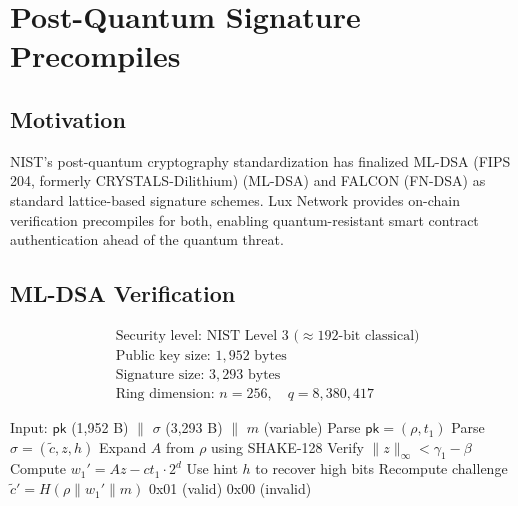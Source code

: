 \section{Post-Quantum Signature Precompiles}
\label{sec:pq}

\subsection{Motivation}

NIST's post-quantum cryptography standardization \cite{nistpqc2024} has finalized ML-DSA (FIPS 204, formerly CRYSTALS-Dilithium) (ML-DSA) and FALCON (FN-DSA) as standard lattice-based signature schemes. Lux Network provides on-chain verification precompiles for both, enabling quantum-resistant smart contract authentication ahead of the quantum threat.

\subsection{ML-DSA Verification}

\begin{definition}
\begin{align}
    &\text{Security level: NIST Level 3 ($\approx 192$-bit classical)} \\
    &\text{Public key size: } 1{,}952 \text{ bytes} \\
    &\text{Signature size: } 3{,}293 \text{ bytes} \\
    &\text{Ring dimension: } n = 256, \quad q = 8{,}380{,}417
\end{align}
\end{definition}

\begin{algorithm}[H]
\caption{Dilithium-3 Verification Precompile}
\label{alg:dilithium}
\begin{algorithmic}[1]
\Require Input: $\mathsf{pk}$ (1,952 B) $\|$ $\sigma$ (3,293 B) $\|$ $m$ (variable)
\State Parse $\mathsf{pk} = (\rho, t_1)$ 
\State Parse $\sigma = (\tilde{c}, z, h)$ 
\State Expand $A$ from $\rho$ using SHAKE-128
\State Verify $\|z\|_\infty < \gamma_1 - \beta$
\State Compute $w_1' = Az - ct_1 \cdot 2^d$
\State Use hint $h$ to recover high bits
\State Recompute challenge $\tilde{c}' = H(\rho \| w_1' \| m)$
    \State \Return 0x01 (valid)
\Else
    \State \Return 0x00 (invalid)
\EndIf
\end{algorithmic}
\end{algorithm}

